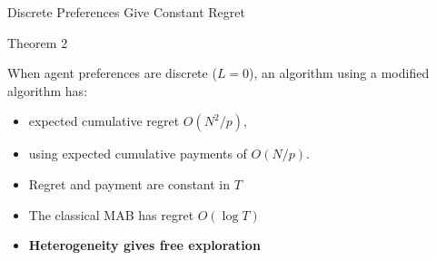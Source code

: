 \documentclass[serif]{beamer}
\begin{document}




\begin{frame}{\large{Discrete Preferences Give Constant Regret}}
\begin{block}{Theorem 2}

When agent preferences are discrete ($L=0$), an algorithm using a modified algorithm has:
\begin{itemize}[label=\textbullet]
\item expected cumulative regret $O (N^2/p)$,
\item using expected cumulative payments of $O(N/p)$.
\end{itemize}
\end{block}

\begin{itemize}[label=\textbullet]
\item Regret and payment are constant in $T$
\item The classical MAB has regret $O(\log T)$
\item \textbf{Heterogeneity gives free exploration}
\end{itemize}

\end{frame}
\end{document}
